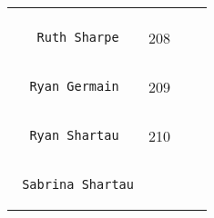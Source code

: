 \documentclass[]{article}
\begin{document}
\begin{longtable}[c]{@{}llll@{}}
\begin{minipage}[t]{0.15\columnwidth}
\end{minipage}
\\\noalign{\medskip}
\begin{minipage}[t]{0.39\columnwidth}\raggedright
\begin{verbatim}
   Ruth Sharpe
\end{verbatim}
\end{minipage} & \begin{minipage}[t]{0.10\columnwidth}\raggedright
208
\end{minipage} & \begin{minipage}[t]{0.13\columnwidth}\raggedright
\end{minipage} & \begin{minipage}[t]{0.15\columnwidth}\raggedright
\end{minipage}
\\\noalign{\medskip}
\begin{minipage}[t]{0.39\columnwidth}\raggedright
\begin{verbatim}
  Ryan Germain
\end{verbatim}
\end{minipage} & \begin{minipage}[t]{0.10\columnwidth}\raggedright
209
\end{minipage} & \begin{minipage}[t]{0.13\columnwidth}\raggedright
\end{minipage} & \begin{minipage}[t]{0.15\columnwidth}\raggedright
\end{minipage}
\\\noalign{\medskip}
\begin{minipage}[t]{0.39\columnwidth}\raggedright
\begin{verbatim}
  Ryan Shartau
\end{verbatim}
\end{minipage} & \begin{minipage}[t]{0.10\columnwidth}\raggedright
210
\end{minipage} & \begin{minipage}[t]{0.13\columnwidth}\raggedright
\end{minipage} & \begin{minipage}[t]{0.15\columnwidth}\raggedright
\end{minipage}
\\\noalign{\medskip}
\begin{minipage}[t]{0.39\columnwidth}\raggedright
\begin{verbatim}
 Sabrina Shartau

\end{verbatim}
\end{minipage}
\end{longtable}
\end{document}
